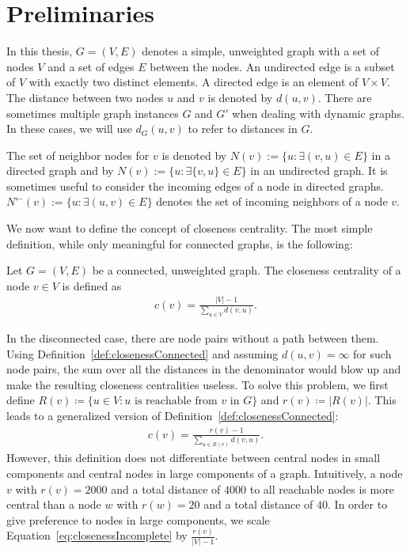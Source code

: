 \chapter{Preliminaries}
\label{ch:preliminaries}

In this thesis, $G = (V, E)$ denotes a simple, unweighted graph with a set of nodes $V$ and a set of edges $E$ between the nodes. An undirected edge is a subset of $V$ with exactly two distinct elements. A directed edge is an element of $V \times V$. The distance between two nodes $u$ and $v$ is denoted by $d(u, v)$. There are sometimes multiple graph instances $G$ and $G'$ when dealing with dynamic graphs. In these cases, we will use $d_G(u, v)$ to refer to distances in $G$.

The set of neighbor nodes for $v$ is denoted by $N(v) := \{u : \exists (v, u) \in E\}$ in a directed graph and by $N(v) := \{u : \exists \{v, u\} \in E\}$ in an undirected graph. It is sometimes useful to consider the incoming edges of a node in directed graphs. $N^{\leftarrow}(v) := \{u : \exists (u, v) \in E\}$ denotes the set of incoming neighbors of a node $v$.

We now want to define the concept of closeness centrality. The most simple definition, while only meaningful for connected graphs, is the following:

\begin{definition}
\label{def:closenessConnected}
Let $G = (V, E)$ be a connected, unweighted graph. The closeness centrality of a node $v \in V$ is defined as
\begin{align*}
	c(v) = \frac{|V| - 1}{\sum_{u \in V}{d(v, u)}}.
\end{align*}
\end{definition}

In the disconnected case, there are node pairs without a path between them. Using Definition~\ref{def:closenessConnected} and assuming $d(u, v) = \infty$ for such node pairs, the sum over all the distances in the denominator would blow up and make the resulting closeness centralities useless. To solve this problem, we first define $R(v) \coloneqq \{u \in V : u \text{ is reachable from }v \text{ in } G\}$ and $r(v) \coloneqq |R(v)|$. This leads to a generalized version of Definition~\ref{def:closenessConnected}:
\begin{align}
	c(v) = \frac{r(v) - 1}{\sum_{u \in R(v)}{d(v, u)}}. \label{eq:closenessIncomplete}
\end{align}
However, this definition does not differentiate between central nodes in small components and central nodes in large components of a graph. Intuitively, a node $v$ with $r(v) = 2000$ and a total distance of $4000$ to all reachable nodes is more central than a node $w$ with $r(w) = 20$ and a total distance of $40$. In order to give preference to nodes in large components, we scale Equation~\ref{eq:closenessIncomplete} by $\frac{r(v)}{|V| - 1}$. 

